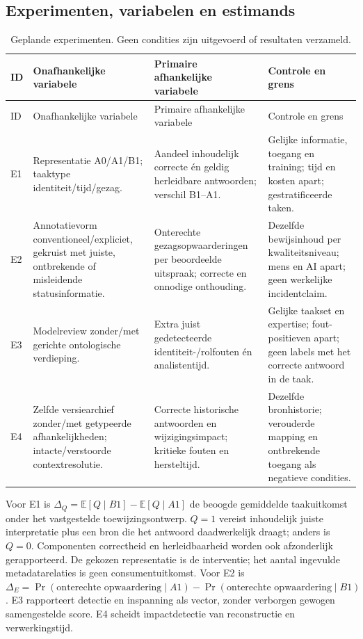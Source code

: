 \subsection{Experimenten, variabelen en estimands}
\begin{longtable}{@{}P{.08\linewidth}P{.27\linewidth}P{.30\linewidth}P{.27\linewidth}@{}}
\caption{Geplande experimenten. Geen condities zijn uitgevoerd of resultaten verzameld.}\label{tab:experiments}\\
\toprule ID & Onafhankelijke variabele & Primaire afhankelijke variabele & Controle en grens \\ \midrule\endfirsthead
\toprule ID & Onafhankelijke variabele & Primaire afhankelijke variabele & Controle en grens \\ \midrule\endhead
E1 & Representatie A0/A1/B1; taaktype identiteit/tijd/gezag. & Aandeel inhoudelijk correcte én geldig herleidbare antwoorden; verschil B1--A1. & Gelijke informatie, toegang en training; tijd en kosten apart; gestratificeerde taken. \\
E2 & Annotatievorm conventioneel/expliciet, gekruist met juiste, ontbrekende of misleidende statusinformatie. & Onterechte gezagsopwaarderingen per beoordeelde uitspraak; correcte en onnodige onthouding. & Dezelfde bewijsinhoud per kwaliteitsniveau; mens en AI apart; geen werkelijke incidentclaim. \\
E3 & Modelreview zonder/met gerichte ontologische verdieping. & Extra juist gedetecteerde identiteit-/rolfouten én analistentijd. & Gelijke taakset en expertise; fout-positieven apart; geen labels met het correcte antwoord in de taak. \\
E4 & Zelfde versiearchief zonder/met getypeerde afhankelijkheden; intacte/verstoorde contextresolutie. & Correcte historische antwoorden en wijzigingsimpact; kritieke fouten en hersteltijd. & Dezelfde bronhistorie; verouderde mapping en ontbrekende toegang als negatieve condities. \\
\bottomrule\end{longtable}

Voor E1 is $\Delta_Q=\mathbb{E}[Q\mid B1]-\mathbb{E}[Q\mid A1]$ de beoogde gemiddelde taakuitkomst onder het vastgestelde toewijzingsontwerp. $Q=1$ vereist inhoudelijk juiste interpretatie plus een bron die het antwoord daadwerkelijk draagt; anders is $Q=0$. Componenten correctheid en herleidbaarheid worden ook afzonderlijk gerapporteerd. De gekozen representatie is de interventie; het aantal ingevulde metadatarelaties is geen consumentuitkomst. Voor E2 is $\Delta_E=\Pr(\text{onterechte opwaardering}\mid A1)-\Pr(\text{onterechte opwaardering}\mid B1)$. E3 rapporteert detectie en inspanning als vector, zonder verborgen gewogen samengestelde score. E4 scheidt impactdetectie van reconstructie en verwerkingstijd.

